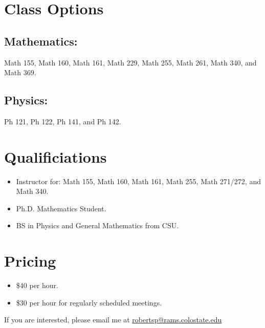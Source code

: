 \documentclass[14pt]{extarticle}
\begin{document}
\begin{center}

\vspace*{1cm}

\end{center}

\section*{Class Options}
\subsection*{Mathematics:}
Math 155, Math 160, Math 161, Math 229, Math 255, Math 261, Math 340, and Math 369.

\subsection*{Physics:}
Ph 121, Ph 122, Ph 141, and Ph 142.

\section*{Qualificiations}
\begin{itemize}
    \item Instructor for: Math 155, Math 160, Math 161, Math 255, Math 271/272, and Math 340.
    \item Ph.D. Mathematics Student.
    \item BS in Physics and General Mathematics from CSU.
\end{itemize}

\section*{Pricing}
\begin{itemize}
    \item \$40 per hour.
    \item \$30 per hour for regularly scheduled meetings.
\end{itemize}

\vspace*{\fill}
If you are interested, please email me at \url{robertsp@rams.colostate.edu}
\end{document}
